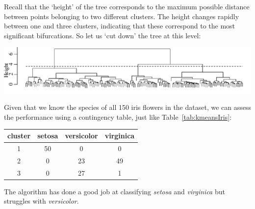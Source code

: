Recall that the `height' of the tree corresponds to the maximum
possible distance between points belonging to two different clusters.
The height changes rapidly between one and three clusters, indicating
that these correspond to the most significant bifurcations. So let us
`cut down' the tree at this level:\medskip

\noindent\includegraphics[width=\textwidth]{../figures/irishtreecut.pdf}
\begingroup {} \endgroup

Given that we know the species of all 150 iris flowers in the dataset,
we can assess the performance using a contingency table, just like
Table~\ref{tab:kmeansIris}:

\begin{center}
  \begin{tabular}{c|ccc}
    cluster & setosa & versicolor & virginica \\ \hline
    1 & 50 & 0 & 0 \\
    2 & 0 & 23 & 49 \\
    3 & 0 & 27 & 1 
  \end{tabular}
  \label{tab:hclustIris}
\end{center}

The algorithm has done a good job at classifying \textit{setosa} and
\textit{virginica} but struggles with \textit{versicolor}.


